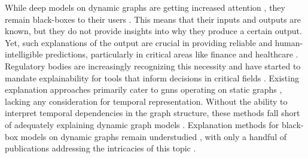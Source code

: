 While deep models on dynamic graphs are getting increased attention \cite{thomas_graph_2023}, they remain black-boxes to their users \cite{vu_limit_2022}. This means that their inputs and outputs are known, but they do not provide insights into why they produce a certain output. Yet, such explanations of the output are crucial in providing reliable and human-intelligible predictions, particularly in critical areas like finance and healthcare \cite{prado-romero_survey_2023}. Regulatory bodies are increasingly recognizing this necessity and have started to mandate explainability for tools that inform decisions in critical fields \cite{european_parliament_proposal_2021}. Existing explanation approaches primarily cater to \glspl{gnn} operating on static graphs \cite{yuan_explainability_2020, kakkad_survey_2023}, lacking any consideration for temporal representation. Without the ability to interpret temporal dependencies in the graph structure, these methods fall short of adequately explaining dynamic graph models \cite{he_explainer_2022, xia_explaining_2023, liu_differential_2023}. Explanation methods for black-box models on dynamic graphs remain understudied \cite{vu_limit_2022, longa_graph_2023}, with only a handful of publications addressing the intricacies of this topic \cite{he_explainer_2022, xia_explaining_2023, xie_explaining_2022, liu_differential_2023, fan_gcn-se_2021}.

